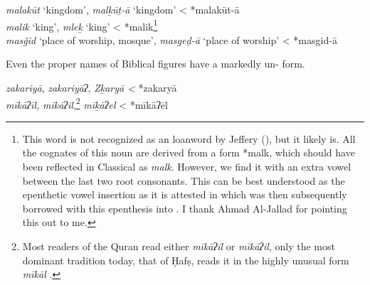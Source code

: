 \documentclass[output=paper]{langsci/langscibook}
\begin{document}
\ea
\ea\textit{malakūt} ‘kingdom’,  \textit{malḵūṯ-ā} ‘kingdom’ < *malakūt-ā\\
\ex\textit{malik} ‘king’,  \textit{mleḵ} ‘king’ < *malik\footnote{This word is not recognized as an  {loanword} by Jeffery (\citeyear[270]{Jeffrey2007}), but it likely is. All the  cognates of this noun are derived from a form *malk, which should have been reflected in Classical  as \textit{malk}. However, we find it with an extra vowel between the last two {root} consonants. This can be best understood as the epenthetic vowel insertion as it is attested in  which was then subsequently borrowed with this {epenthesis} into . I thank Ahmad Al-Jallad for pointing this out to me.}\\
\ex\textit{masǧid} ‘place of worship, mosque’,  \textit{masgeḏ-ā} ‘place of worship’ < *masgid-ā
\z
\z

\noindent Even the proper names of Biblical figures have a markedly un- form.

\ea
\ea\textit{zakariyā}, \textit{zakariyāʔ},  \textit{Zḵaryā} \textit{<} *zakaryā\\
\ex\textit{mīkāʔīl,} \textit{mīkāʔil},\footnote{Most readers of the {Quran} read either \textit{mīkāʔīl} or \textit{mīkāʔil}, only the most dominant tradition today, that of Ḥafṣ, reads it in the highly unusual form \textit{mīkāl} \citep[166]{IbnMujahid}.}  \textit{mīḵāʔel} < *mīkāʔēl
\z
\z
\end{document}
